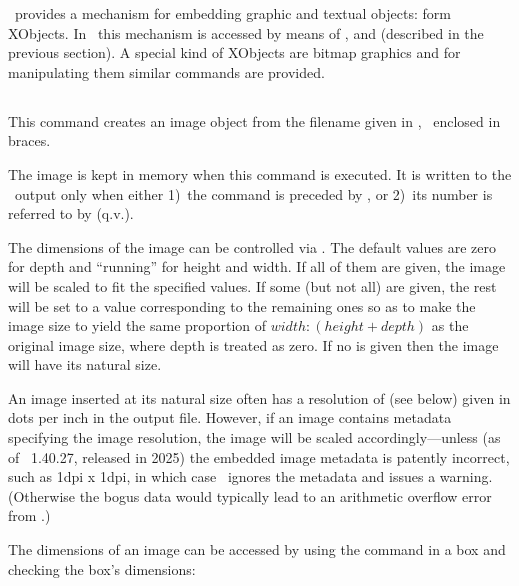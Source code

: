 \documentclass{pdftexmanual}
\begin{document}
\PDF\ provides a mechanism for embedding graphic and textual objects:
form XObjects. In \PDFTEX\ this mechanism is accessed by means of
,  and  (described in the
previous section). A special kind of XObjects are bitmap graphics and
for manipulating them similar commands are provided.

\subsection{}

This command creates an image object from the filename given in
, \ie\ enclosed in braces.

The image is kept in memory when this command is executed. It is written
to the \PDF\ output only when either 1)~the  command is
preceded by , or 2)~its number is referred to by
 (q.v.).

The dimensions of the image can be controlled via .
The default values are zero for depth and ``running'' for height and
width. If all of them are given, the image will be scaled to fit the
specified values. If some (but not all) are given, the rest will be set
to a value corresponding to the remaining ones so as to make the image
size to yield the same proportion of $width : (height+depth)$ as the
original image size, where depth is treated as zero. If no
 is given then the image will have its natural
size.

An image inserted at its natural size often has a resolution of
\type{\pdfimageresolution} (see below) given in dots per inch in the
output file. However, if an image contains metadata specifying the image
resolution, the image will be scaled accordingly---unless (as of
\PDFTEX\ 1.40.27, released in 2025) the embedded image metadata is
patently incorrect, such as 1dpi x 1dpi, in which case \PDFTEX\ ignores
the metadata and issues a warning. (Otherwise the bogus data would
typically lead to an arithmetic overflow error from \TEX.)

The dimensions of an image can be accessed by using the
 command in a box and checking the box's dimensions:
\end{document}
